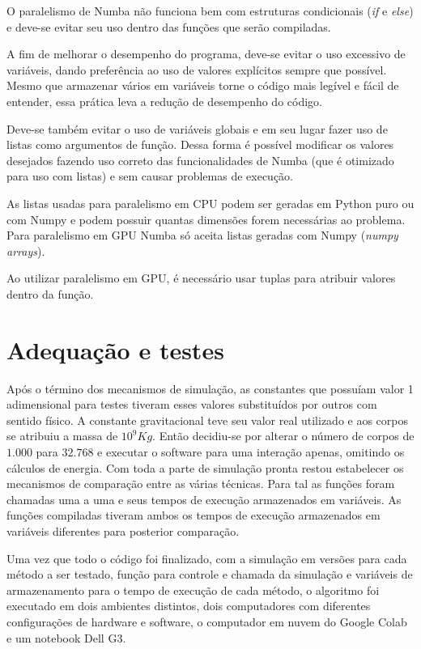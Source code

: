 \documentclass[
	12pt,				%
	a4paper,			%
	english,			%
	openright,				%
	brazil,				%
	oneside]{abntex2}
\begin{document}
	O paralelismo de Numba não funciona bem com estruturas condicionais (\textit{if} e \textit{else}) e deve-se evitar seu uso dentro das funções que serão compiladas.
	
	A fim de melhorar o desempenho do programa, deve-se evitar o uso excessivo de variáveis, dando preferência ao uso de valores explícitos sempre que possível. Mesmo que armazenar vários em variáveis torne o código mais legível e fácil de entender, essa prática leva a redução de desempenho do código.
	
	Deve-se também evitar o uso de variáveis globais e em seu lugar fazer uso de listas como argumentos de função. Dessa forma é possível modificar os valores desejados fazendo uso correto das funcionalidades de Numba (que é otimizado para uso com listas) e sem causar problemas de execução.
	
	As listas usadas para paralelismo em CPU podem ser geradas em Python puro ou com Numpy e podem possuir quantas dimensões forem necessárias ao problema.
	Para paralelismo em GPU Numba só aceita listas geradas com Numpy (\textit{numpy arrays}).
	
	Ao utilizar paralelismo em GPU, é necessário usar tuplas para atribuir valores dentro da função.
	
	\section{Adequação e testes}
	Após o término dos mecanismos de simulação, as constantes que possuíam valor 1 adimensional para testes tiveram esses valores substituídos por outros com sentido físico. A constante gravitacional teve seu valor real utilizado e aos corpos se atribuiu a massa de $10^9 Kg$. Então decidiu-se por alterar o número de corpos de $1.000$ para $32.768$ e executar o software para uma interação apenas, omitindo os cálculos de energia.
	Com toda a parte de simulação pronta restou estabelecer os mecanismos de comparação entre as várias técnicas. Para tal as funções foram chamadas uma a uma e seus tempos de execução armazenados em variáveis. As funções compiladas tiveram ambos os tempos de execução armazenados em variáveis diferentes para posterior comparação.
	
	Uma vez que todo o código foi finalizado, com a simulação em versões para cada método a ser testado, função para controle e chamada da simulação e variáveis de armazenamento para o tempo de execução de cada método, o algoritmo foi executado em dois ambientes distintos, dois computadores com diferentes configurações de hardware e software, o computador em nuvem do Google Colab e um notebook Dell G3.
	
\end{document}
